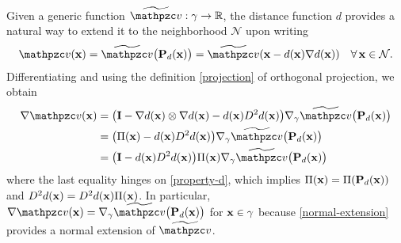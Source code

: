 Given a generic function $\widetilde\tv:\gamma\to\mathbb{R}$,
the distance function $d$ provides a natural way to extend it
to the neighborhood $\mathcal{N}$ upon writing
%
\begin{equation}\label{normal-extension}
\tv(\bx) = \widetilde\tv\big(\bP_d(\bx)  \big)
= \widetilde\tv (\bx - d(\bx) \nabla d(\bx))
\quad\forall \, \bx\in\mathcal{N}.
\end{equation}
%
Differentiating and using the definition \eqref{projection} of orthogonal
projection, we obtain
%
\begin{equation}\label{e:rel_dist_grad}
\begin{aligned}
\nabla \tv(\bx) &= \big(\bI - \nabla d(\bx)\otimes\nabla d(\bx) - d(\bx) D^2 d(\bx) \big)
\nabla_\gamma \widetilde \tv\big(\bP_d(\bx)\big)
\\
& = \big(\Pi(\bx) - d(\bx) D^2 d(\bx)\big) \nabla_\gamma \widetilde \tv\big(\bP_d(\bx)\big)
\\
&= \big(\bI - d(\bx) D^2 d(\bx)\big) \Pi(\bx)\nabla_\gamma \widetilde \tv\big(\bP_d(\bx)\big)
\end{aligned}
\end{equation}
%
where the last equality hinges on \eqref{property-d}, which implies
$\Pi({\bf x}) = \Pi({\bf P}_d({\bf x}))$ and $D^2 d({\bf x})=D^2 d({\bf x}) \Pi({\bf x})$. In particular,
$\nabla \tv(\bx) = \nabla_\gamma \widetilde \tv\big(\bP_d(\bx)\big)$
for ${\bf x}\in\gamma$ because
\eqref{normal-extension} provides a normal extension of $\widetilde \tv$.

